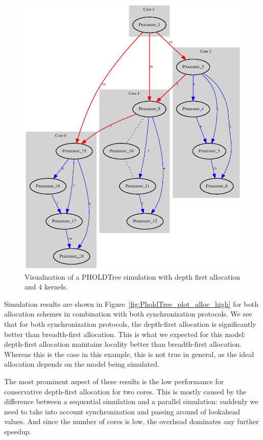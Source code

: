 \begin{figure}
    \center
    \includegraphics[width=\columnwidth]{fig/pholdtreed1n3t5000c4DFS.eps}
    \caption{Visualization of a PHOLDTree simulation with depth first allocation and 4 kernels.}
    \label{fig:pholdtree_visualize_parDFS}
\end{figure}

Simulation results are shown in Figure~\ref{fig:PholdTree_plot_alloc_high} for both allocation schemes in combination with both synchronization protocols.
We see that for both synchronization protocols, the depth-first allocation is significantly better than breadth-first allocation.
This is what we expected for this model: depth-first allocation maintains locality better than breadth-first allocation.
Whereas this is the case in this example, this is not true in general, as the ideal allocation depends on the model being simulated.

The most prominent aspect of these results is the low performance for conservative depth-first allocation for two cores.
This is mostly caused by the difference between a sequential simulation and a parallel simulation: suddenly we need to take into account synchronization and passing around of lookahead values.
And since the number of cores is low, the overhead dominates any further speedup.

